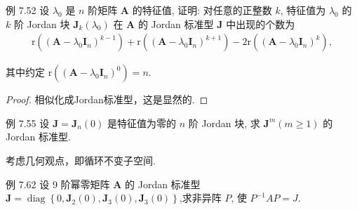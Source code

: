 \begin{theorem}
    例 7.52 设 $\lambda_0$ 是 $n$ 阶矩阵 $\boldsymbol{A}$ 的特征值, 证明: 对任意的正整数 $k$, 特征值为 $\lambda_0$ 的 $k$ 阶 Jordan 块 $\boldsymbol{J}_k\left(\lambda_0\right)$ 在 $\boldsymbol{A}$ 的 Jordan 标准型 $\boldsymbol{J}$ 中出现的个数为
    \begin{align*}
        \mathrm{r}\left(\left(\boldsymbol{A}-\lambda_0 \boldsymbol{I}_n\right)^{k-1}\right)+\mathrm{r}\left(\left(\boldsymbol{A}-\lambda_0 \boldsymbol{I}_n\right)^{k+1}\right)-2 \mathrm{r}\left(\left(\boldsymbol{A}-\lambda_0 \boldsymbol{I}_n\right)^k\right),
    \end{align*}

    其中约定 $\mathrm{r}\left(\left(\boldsymbol{A}-\lambda_0 \boldsymbol{I}_n\right)^0\right)=n$.
\end{theorem}

\begin{proof}
    相似化成Jordan标准型，这是显然的.
\end{proof}

\begin{exercise}
例 7.55 设 $\boldsymbol{J}=\boldsymbol{J}_n(0)$ 是特征值为零的 $n$ 阶 Jordan 块, 求 $\boldsymbol{J}^m(m \geq 1)$ 的 Jordan 标准型.
\end{exercise}

\begin{note}
    考虑几何观点，即循环不变子空间.
\end{note}

\begin{exercise}
例 7.62 设 9 阶幂零矩阵 $\boldsymbol{A}$ 的 Jordan 标准型 $\boldsymbol{J}=\operatorname{diag}\left\{0, \boldsymbol{J}_2(0), \boldsymbol{J}_3(0), \boldsymbol{J}_3(0)\right\}$,求非异阵 $P$, 使 $P^{-1} A P=J$.
\end{exercise}

